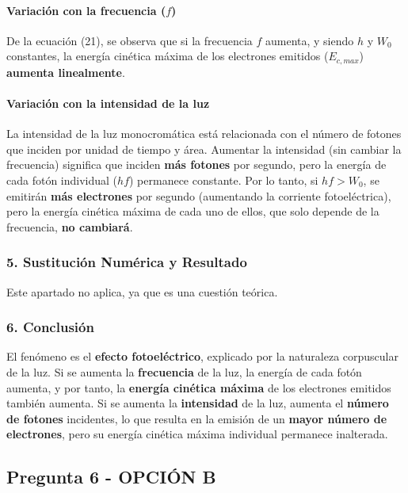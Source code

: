 \paragraph*{Variación con la frecuencia ($f$)}
De la ecuación (21), se observa que si la frecuencia $f$ aumenta, y siendo $h$ y $W_0$ constantes, la energía cinética máxima de los electrones emitidos ($E_{c,max}$) \textbf{aumenta linealmente}.

\paragraph*{Variación con la intensidad de la luz}
La intensidad de la luz monocromática está relacionada con el número de fotones que inciden por unidad de tiempo y área. Aumentar la intensidad (sin cambiar la frecuencia) significa que inciden \textbf{más fotones} por segundo, pero la energía de cada fotón individual ($hf$) permanece constante. Por lo tanto, si $hf > W_0$, se emitirán \textbf{más electrones} por segundo (aumentando la corriente fotoeléctrica), pero la energía cinética máxima de cada uno de ellos, que solo depende de la frecuencia, \textbf{no cambiará}.

\subsubsection*{5. Sustitución Numérica y Resultado}
Este apartado no aplica, ya que es una cuestión teórica.

\subsubsection*{6. Conclusión}
\begin{cajaconclusion}
    El fenómeno es el \textbf{efecto fotoeléctrico}, explicado por la naturaleza corpuscular de la luz. Si se aumenta la \textbf{frecuencia} de la luz, la energía de cada fotón aumenta, y por tanto, la \textbf{energía cinética máxima} de los electrones emitidos también aumenta. Si se aumenta la \textbf{intensidad} de la luz, aumenta el \textbf{número de fotones} incidentes, lo que resulta en la emisión de un \textbf{mayor número de electrones}, pero su energía cinética máxima individual permanece inalterada.
\end{cajaconclusion}

\newpage

\subsection{Pregunta 6 - OPCIÓN B}
\label{subsec:6B_2025_jul_ord}

